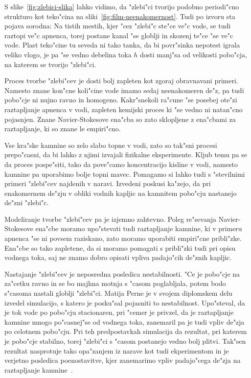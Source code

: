 \documentclass[a4paper,10pt]{article}
\begin{document}
S slike~\ref{fig:zlebici-slika} lahko vidimo, da "zlebi"ci tvorijo podobno periodi"cno strukturo kot teko"cina na sliki~\ref{fig:film-neenakomernost}. Tudi po izvoru sta pojava sorodna: Na tistih mestih, kjer "cez "zlebi"c ste"ce ve"c vode, se tudi raztopi ve"c apnenca, torej postane kanal "se globlji in skozenj te"ce "se ve"c vode. Plast teko"cine tu seveda ni tako tanka, da bi povr"sinka nepotest igrala veliko vlogo, je pa "se vedno debelina toka $h$ dosti manj"sa od velikosti pobo"cja, na katerem se tvorijo "zlebi"ci. 

Proces tvorbe "zlebi"cev je dosti bolj zapleten kot zgoraj obravnavani primeri. Namesto znane kon"cne koli"cine vode imamo sedaj neenakomeren de"z, pa tudi pobo"cje ni nujno ravno in homogeno. Kakr"snekoli ra"cune "se posebej ote"zi raztapljanje apnenca v vodi, zapleten kemijski proces ki "se vedno ni natan"cno pojasnjen. Znane Navier-Stokesove ena"cba so zato sklopljene z ena"cbami za raztapljanje, ki so znane le empiri"cno. 

Vse kra"ske kamnine so zelo slabo topne v vodi, zato so tak"sni procesi prepo"casni, da bi lahko z njimi izvajali fizikalne eksperimente. Kljub temu pa se da proces pospe"siti, tako da pove"camo koncentracijo kisline v vodi, namesto kamnine pa uporabimo bolje topni mavec. Pomagamo si lahko tudi s "stevilnimi primeri "zlebi"cev najdenih v naravi. Izvedeni poskusi ka"zejo, da pri enakomernem de"zju v obliki vodnih kapljic na kamnitem pobo"cju nastanejo de"zni "zlebi"c. 

Modeliranje tvorbe "zlebi"cev pa je izjemno zahtevno. Poleg re"sevanja Navier-Stokesove ena"cbe moramo upo"stevati tudi raztapljanje kamnine, ki v primeru apnenca "se ni povsem raziskano, zato moramo uporabiti empiri"cne pribli"zke. Ena"cbe so tako zapletene, da si moramo pomagati s pribli"zki tudi pri opisu vodnega toka, saj ne znamo dobro opisati vpliva padajo"cih de"znih kapljic. 

Nastajanje "zlebi"cev je neposredna posledica nestabilnosti. "Ce je pobo"cje na za"cetku ravno in se bo majhna motnja s "casom poglabljala, potem bodo s"casoma nastali globlji "zlebi"ci. Matija Perne je v svojem diplomskem delu izvedel simulacijo, s katero je posku"sal pojasniti to nestabilnost. Upo"steval, da je tok vode po pobo"cju stacionaren, pri "cemer je privzel, da je raztapljanje kamnine mnogo po"casnej"se od vodnega toka, zanemaril pa je tudi vpliv de"zja po celotnem pobo"cju. Pri teh predpostavkah simulacija da rezultat, pri katerem je pobo"cje stabilno, torej "zlebi"ci s "casom postanejo vedno bolj plitvi. Tak"sen rezultat nasprotuje tako opa"zanjem iz narave kot tudi ekperimentom in je verjetno posledica poenostavitve, kjer zanemarimo vpliv padajo"cega de"zja na raztapljanje kamnine~\cite{perne}. 
\end{document}
